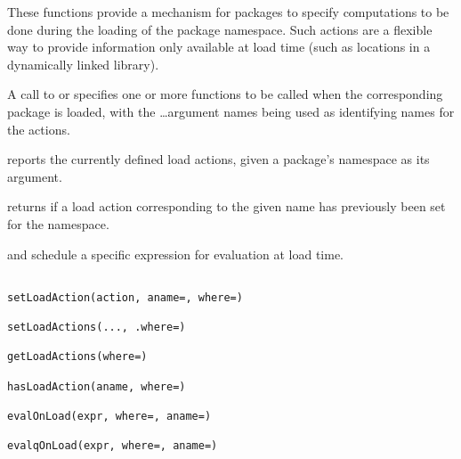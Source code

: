 \begin{Description}\relax
These functions 
provide a mechanism
for packages to specify computations to be done during the loading of
the package namespace.
Such actions are a flexible way to provide information only available
at load time (such as locations in a dynamically linked library).


A call to
  or  specifies one or more functions
to be
called when the corresponding package is loaded, with the \dots argument
names being used as identifying names for the actions.

 reports the currently defined load actions,
given a package's namespace as its argument.

 returns  if a load action
corresponding to the given name has previously been set for the
 namespace.

 and  schedule a specific expression for
evaluation at load time.
\end{Description}
%
\begin{Usage}
\begin{verbatim}

setLoadAction(action, aname=, where=)

setLoadActions(..., .where=)

getLoadActions(where=)

hasLoadAction(aname, where=)

evalOnLoad(expr, where=, aname=)

evalqOnLoad(expr, where=, aname=)

\end{verbatim}
\end{Usage}
%
